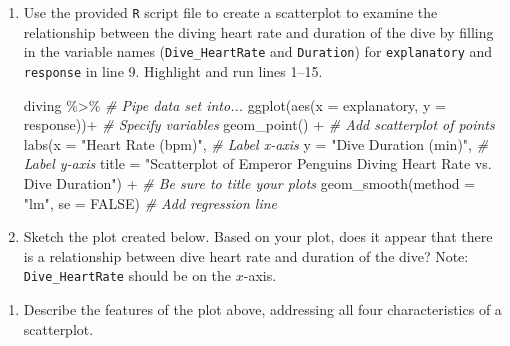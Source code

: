\documentclass[
]{report}
\newenvironment{Shaded}{\begin{snugshade}}{\end{snugshade}}
\newcommand{\AttributeTok}[1]{\textcolor[rgb]{0.77,0.63,0.00}{#1}}
\newcommand{\CommentTok}[1]{\textcolor[rgb]{0.56,0.35,0.01}{\textit{#1}}}
\newcommand{\ConstantTok}[1]{\textcolor[rgb]{0.00,0.00,0.00}{#1}}
\newcommand{\FunctionTok}[1]{\textcolor[rgb]{0.00,0.00,0.00}{#1}}
\newcommand{\NormalTok}[1]{#1}
\newcommand{\SpecialCharTok}[1]{\textcolor[rgb]{0.00,0.00,0.00}{#1}}
\newcommand{\StringTok}[1]{\textcolor[rgb]{0.31,0.60,0.02}{#1}}
\providecommand{\tightlist}{%
  \setlength{\itemsep}{0pt}\setlength{\parskip}{0pt}}
\begin{document}
\begin{enumerate}
\def\labelenumi{\arabic{enumi}.}
\setcounter{enumi}{1}
\item
  Use the provided \texttt{R} script file to create a scatterplot to examine the relationship between the diving heart rate and duration of the dive by filling in the variable names (\texttt{Dive\_HeartRate} and \texttt{Duration}) for \texttt{explanatory} and \texttt{response} in line 9. Highlight and run lines 1--15.

\begin{Shaded}
\begin{Highlighting}[]
\NormalTok{diving }\SpecialCharTok{\%\textgreater{}\%} \CommentTok{\# Pipe data set into...}
\FunctionTok{ggplot}\NormalTok{(}\FunctionTok{aes}\NormalTok{(}\AttributeTok{x =}\NormalTok{ explanatory, }\AttributeTok{y =}\NormalTok{ response))}\SpecialCharTok{+}  \CommentTok{\# Specify variables}
  \FunctionTok{geom\_point}\NormalTok{() }\SpecialCharTok{+}  \CommentTok{\# Add scatterplot of points}
  \FunctionTok{labs}\NormalTok{(}\AttributeTok{x =} \StringTok{"Heart Rate (bpm)"}\NormalTok{,  }\CommentTok{\# Label x{-}axis}
       \AttributeTok{y =} \StringTok{"Dive Duration (min)"}\NormalTok{,  }\CommentTok{\# Label y{-}axis}
       \AttributeTok{title =} \StringTok{"Scatterplot of Emperor Penguins Diving Heart Rate vs. Dive Duration"}\NormalTok{) }\SpecialCharTok{+} 
               \CommentTok{\# Be sure to title your plots}
  \FunctionTok{geom\_smooth}\NormalTok{(}\AttributeTok{method =} \StringTok{"lm"}\NormalTok{, }\AttributeTok{se =} \ConstantTok{FALSE}\NormalTok{)  }\CommentTok{\# Add regression line}
\end{Highlighting}
\end{Shaded}
\item
  Sketch the plot created below. Based on your plot, does it appear that there is a relationship between dive heart rate and duration of the dive? Note: \texttt{Dive\_HeartRate} should be on the \(x\)-axis.
\end{enumerate}

\vspace{2in}

\begin{enumerate}
\def\labelenumi{\arabic{enumi}.}
\setcounter{enumi}{3}
\tightlist
\item
  Describe the features of the plot above, addressing all four characteristics of a scatterplot.
\end{enumerate}

\vspace{1in}
\end{document}

